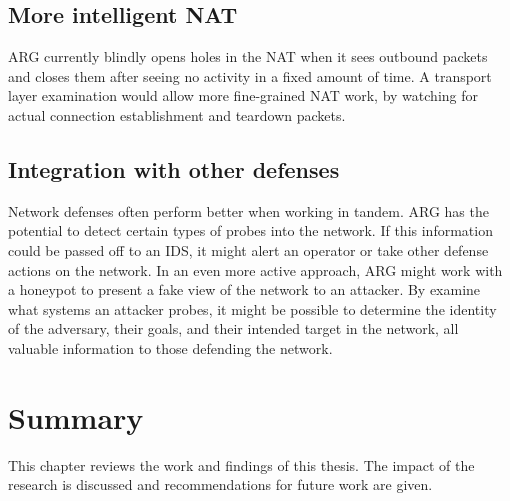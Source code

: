 
\subsection{More intelligent NAT}
\par \ac{ARG} currently blindly opens holes in the \ac{NAT} when it sees outbound packets and closes them after seeing no activity in a fixed amount of time. A transport layer examination would allow more fine-grained \ac{NAT} work, by watching for actual connection establishment and teardown packets. 

\subsection{Integration with other defenses}
\par Network defenses often perform better when working in tandem. \ac{ARG} has the potential to detect certain types of probes into the network. If this information could be passed off to an \ac{IDS}, it might alert an operator or take other defense actions on the network. In an even more active approach, \ac{ARG} might work with a honeypot to present a fake view of the network to an attacker. By examine what systems an attacker probes, it might be possible to determine the identity of the adversary, their goals, and their intended target in the network, all valuable information to those defending the network.

\section{Summary}
\par This chapter reviews the work and findings of this thesis. The impact of the research is discussed and recommendations for future work are given.

